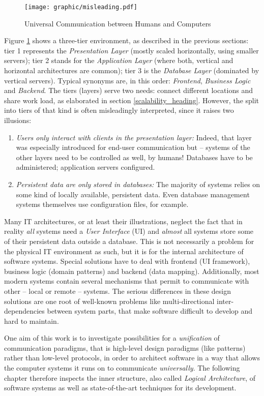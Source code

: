 \begin{figure}[ht]
    \begin{center}
        \texttt{[image: graphic/misleading.pdf]}
        \caption{Universal Communication between Humans and Computers}
        \label{misleading_figure}
    \end{center}
\end{figure}

Figure \ref{misleading_figure} shows a three-tier environment, as described in
the previous sections: tier 1 represents the \emph{Presentation Layer} (mostly
scaled horizontally, using smaller servers); tier 2 stands for the
\emph{Application Layer} (where both, vertical and horizontal architectures are
common); tier 3 is the \emph{Database Layer} (dominated by vertical servers).
Typical synonyms are, in this order: \emph{Frontend}, \emph{Business Logic} and
\emph{Backend}. The tiers (layers) serve two needs: connect different locations
and share work load, as elaborated in section \ref{scalability_heading}. However,
the split into tiers of that kind is often misleadingly interpreted, since it
raises two illusions:

\begin{enumerate}
    \item \emph{Users only interact with clients in the presentation layer:}
        Indeed, that layer was especially introduced for end-user communication
        but -- systems of the other layers need to be controlled as well, by
        humans! Databases have to be administered; application servers configured.
    \item \emph{Persistent data are only stored in databases:} The majority of
        systems relies on some kind of locally available, persistent data. Even
        database management systems themselves use configuration files, for
        example.
\end{enumerate}

Many IT architectures, or at least their illustrations, neglect the fact that in
reality \emph{all} systems need a \emph{User Interface} (UI) and \emph{almost}
all systems store some of their persistent data outside a database. This is not
necessarily a problem for the physical IT environment as such, but it is for the
internal architecture of software systems. Special solutions have to deal with
frontend (UI framework), business logic (domain patterns) and backend (data
mapping). Additionally, most modern systems contain several mechanisms that
permit to communicate with other -- local or remote -- systems. The serious
differences in these design solutions are one root of well-known problems like
multi-directional inter-dependencies between system parts, that make software
difficult to develop and hard to maintain.

One aim of this work is to investigate possibilities for a \emph{unification}
of communication paradigms, that is high-level design paradigms (like patterns)
rather than low-level protocols, in order to architect software in a way that
allows the computer systems it runs on to communicate \emph{universally}.
The following chapter therefore inspects the inner structure, also called
\emph{Logical Architecture}, of software systems as well as state-of-the-art
techniques for its development.

